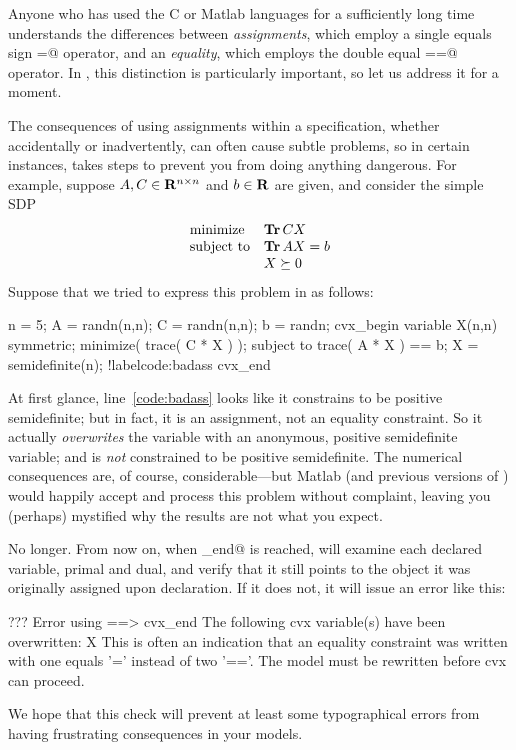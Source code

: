 \documentclass[12pt]{article}
\begin{document}
Anyone who has used the C or Matlab languages for a sufficiently long time
understands the differences between \emph{assignments}, which employ a single
equals sign \verb@=@ operator, and an \emph{equality}, which employs the
double equal \verb@==@ operator. In \cvx, this distinction is particularly
important, so let us address it for a moment.

The consequences of using assignments within a \cvx specification, whether
accidentally or inadvertently, can often cause subtle problems, so in certain
instances, \cvx takes steps to prevent you from doing anything dangerous.
For example, suppose $A,C\in\mathbf{R}^{{n}\times{n}}$ and $b\in\R$ are given, and
consider the simple SDP
\begin{equation}
	\begin{array}{ll}
		\text{minimize} & \operatorname{\textbf{Tr}}{CX} \\
		\text{subject to} & \operatorname{\textbf{Tr}}{AX} = b \\
		& X \succeq 0
	\end{array}
\end{equation}	
Suppose that we tried to express this problem in \cvx as follows:
\begin{code2}[firstnumber=1]
	n = 5;
	A = randn(n,n); C = randn(n,n); b = randn;
	cvx_begin
	    variable X(n,n) symmetric;
	    minimize( trace( C * X ) );
	    subject to
	        trace( A * X ) == b;
	        X = semidefinite(n);		!label{code:badass}
	cvx_end
\end{code2}
At first glance, line~\ref{code:badass} looks like it constrains \verb@X@ to be positive
semidefinite; but in fact, it is an assignment, not an equality constraint. So
it actually \emph{overwrites} the
variable \verb@X@ with an anonymous, positive semidefinite variable; and \verb@X@
is \emph{not} constrained to be positive semidefinite. The numerical
consequences are, of course, considerable---but Matlab (and previous versions of \cvx)
would happily accept and process this problem without complaint, leaving you (perhaps)
mystified why the results are not what you expect.

No longer. From now on, when \verb@cvx_end@ is reached, \cvx will examine each 
declared variable, primal and dual, and verify that it still points to the object it was originally
assigned upon declaration. If it does not, 
it will issue an error like this:
\begin{code}
	??? Error using ==> cvx_end
	The following cvx variable(s) have been overwritten:
	   X
	This is often an indication that an equality constraint was
	written with one equals '=' instead of two '=='. The model
	must be rewritten before cvx can proceed.
\end{code}	
We hope that this check will prevent at least some typographical errors from 
having frustrating consequences in your models.
\end{document}
